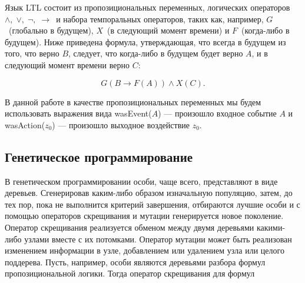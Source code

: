 \documentclass[12pt,fleqn]{article}
\begin{document}
Язык LTL состоит из пропозициональных переменных, логических операторов $\wedge,\; \vee,\; \lnot,\; \rightarrow$\ и набора
темпоральных операторов, таких как, например, $G$\ (глобально в будущем), $X$\ (в следующий момент времени) и
$F$\ (когда-либо в будущем). Ниже приведена формула, утверждающая, что всегда в будущем из того, что верно $B$, следует,
что когда-либо в будущем будет верно $A$, и в следующий момент времени верно $C$:

$$
G(B \rightarrow F(A)) \wedge X(C).
$$

В данной работе в качестве пропозициональных переменных мы будем использовать выражения вида wasEvent($A$) --- произошло
входное событие $A$ и wasAction($z_0$) --- произошло выходное воздействие $z_0$.

\subsection{Генетическое программирование}

В генетическом программировании \cite{kz1} особи, чаще всего, представляют в виде деревьев. Сгенерировав каким-либо
образом изначальную популяцию, затем, до тех пор, пока не выполнится критерий завершения, отбираются лучшие особи
и с помощью операторов скрещивания и мутации генерируется новое поколение.
Оператор скрещивания реализуется обменом между двумя деревьями какими-либо узлами вместе с их
потомками. Оператор мутации может быть реализован изменением информации в узле, добавлением или удалением узла
или целого поддерева. Пусть, например, особи являются деревьями разбора формул пропозициональной логики.
Тогда оператор скрещивания для формул

\setcounter{topnumber}{10}
\setcounter{bottomnumber}{10}
\setcounter{totalnumber}{10}

\FloatBarrier
\end{document}
